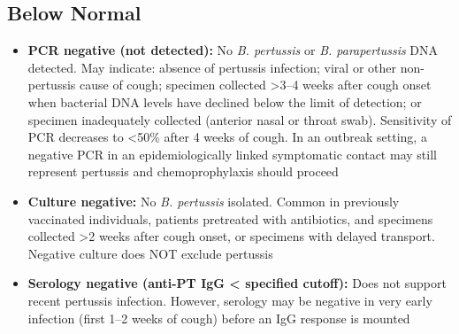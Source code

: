\subsection*{Below Normal}
\begin{itemize}
  \item \textbf{PCR negative (not detected):} No \textit{B. pertussis} or \textit{B. parapertussis} DNA detected. May indicate: absence of pertussis infection; viral or other non-pertussis cause of cough; specimen collected >3--4 weeks after cough onset when bacterial DNA levels have declined below the limit of detection; or specimen inadequately collected (anterior nasal or throat swab). Sensitivity of PCR decreases to <50\% after 4 weeks of cough. In an outbreak setting, a negative PCR in an epidemiologically linked symptomatic contact may still represent pertussis and chemoprophylaxis should proceed
  \item \textbf{Culture negative:} No \textit{B. pertussis} isolated. Common in previously vaccinated individuals, patients pretreated with antibiotics, and specimens collected >2 weeks after cough onset, or specimens with delayed transport. Negative culture does NOT exclude pertussis
  \item \textbf{Serology negative (anti-PT IgG < specified cutoff):} Does not support recent pertussis infection. However, serology may be negative in very early infection (first 1--2 weeks of cough) before an IgG response is mounted
\end{itemize}

